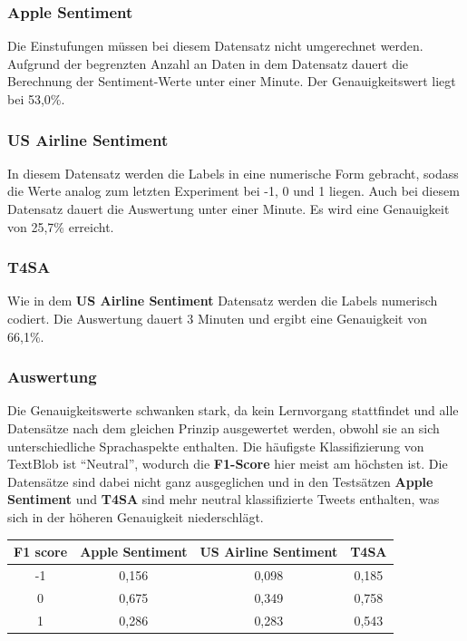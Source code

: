 \subsubsection*{Apple Sentiment}
Die Einstufungen m\"ussen bei diesem Datensatz nicht umgerechnet werden. Aufgrund der begrenzten Anzahl an Daten in dem Datensatz dauert die Berechnung der Sentiment-Werte unter einer Minute. Der Genauigkeitswert liegt bei 53,0\%.

\subsubsection*{US Airline Sentiment}
In diesem Datensatz werden die Labels in eine numerische Form gebracht, sodass die Werte analog zum letzten Experiment bei -1, 0 und 1 liegen. Auch bei diesem Datensatz dauert die Auswertung unter einer Minute. Es wird eine Genauigkeit von 25,7\% erreicht.

\subsubsection*{T4SA}
Wie in dem \textbf{US Airline Sentiment} Datensatz werden die Labels numerisch codiert. Die Auswertung dauert 3 Minuten und ergibt eine Genauigkeit von 66,1\%.

\subsubsection*{Auswertung}
Die Genauigkeitswerte schwanken stark, da kein Lernvorgang stattfindet und alle Datens\"atze nach dem gleichen Prinzip ausgewertet werden, obwohl sie an sich unterschiedliche Sprachaspekte enthalten. Die h\"aufigste Klassifizierung von TextBlob ist "`Neutral"', wodurch die \textbf{F1-Score} hier meist am h\"ochsten ist. Die Datens\"atze sind dabei nicht ganz ausgeglichen und in den Tests\"atzen \textbf{Apple Sentiment} und \textbf{T4SA} sind mehr neutral klassifizierte Tweets enthalten, was sich in der h\"oheren Genauigkeit niederschl\"agt.
\begin{center}
\begin{tabular}{|c||c|c|c|}
\hline
F1 score & Apple Sentiment & US Airline Sentiment & T4SA\\ 
\hline\hline
-1 & 0,156 & 0,098 & 0,185\\
\hline
0 & 0,675 & 0,349 & 0,758\\ 
\hline
1 & 0,286 & 0,283 & 0,543\\
\hline    
\end{tabular}
\end{center}

